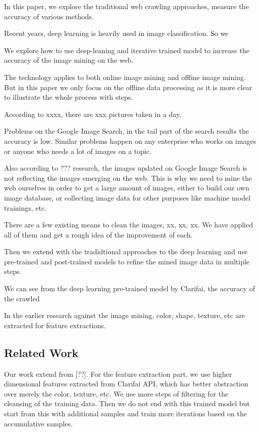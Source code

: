 \documentclass[paper=a4, fontsize=11pt]{scrartcl}
\numberwithin{equation}{section}		%
\numberwithin{figure}{section}			%
\numberwithin{table}{section}				%
\begin{document}
\begin{multicols}{2}
\noindent In this paper, we explore the traditional web crawling approaches, measure the accuracy of various methods.

\noindent Recent years, deep learning is heavily used in image classification. So we 

\noindent We explore how to use deep-leaning and iterative trained model to increase the accuracy of the image mining on the web.

\noindent The technology applies to both online image mining and offline image mining. But in this paper we only focus on the offline data processing as it is more clear to illustrate the whole process with steps. 

\noindent According to xxxx, there are xxx pictures taken in a day.

\noindent Problems on the Google Image Search, in the tail part of the search results the accuracy is low. Similar problems happen on any enterprise who works on images or anyone who needs a lot of images on a topic.

\noindent Also according to ??? research, the images updated on Google Image Search is not reflecting the images emerging on the web. This is why we need to mine the web ourselves in order to get a large amount of images, either to build our own image database, or collecting image data for other purposes like machine model trainings, etc.

\noindent There are a few existing means to clean the images, xx, xx, xx. We have applied all of them and get a rough idea of the improvement of each.

\noindent Then we extend with the tradidtional approaches to the deep learning and use pre-trained and post-trained models to refine the mined image data in multiple steps.

\noindent We can see from the deep learning pre-trained model by Clarifai, the accuracy of the crawled 

\noindent In the earlier research against the image mining, color, shape, texture, etc are extracted for feature extractions.



\subsection{Related Work}

\noindent Our work extend from [??]. For the feature extraction part, we use higher dimensional features extracted from Clarifai API, which has better abstraction over merely the color, texture, etc. We use more steps of filtering for the cleansing of the training data. Then we do not end with this trained model but start from this with additional samples and train more iterations based on the accumulative samples.


\end{multicols}
\end{document}
